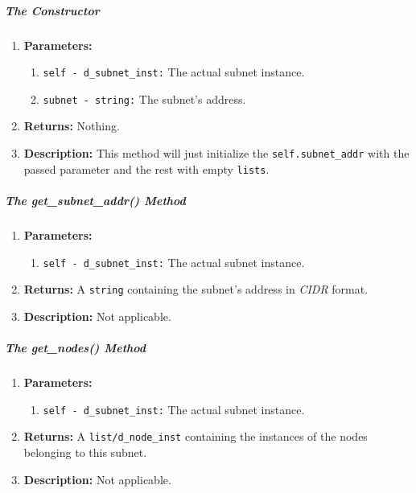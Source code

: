         \subparagraph{The Constructor}
            \begin{enumerate}
                \item \textbf{Parameters:}
                \begin{enumerate}
                    \item \texttt{self - d\_subnet\_inst:} The actual subnet instance.
                    \item \texttt{subnet - string:} The subnet's address.
                \end{enumerate}
                \item \textbf{Returns:} Nothing.
                \item \textbf{Description:} This method will just initialize the \texttt{self.subnet\_addr} with the passed parameter and the rest with empty \texttt{lists}.
            \end{enumerate}

        \subparagraph{The get\_subnet\_addr() Method}
            \begin{enumerate}
                \item \textbf{Parameters:}
                \begin{enumerate}
                    \item \texttt{self - d\_subnet\_inst:} The actual subnet instance.
                \end{enumerate}
                \item \textbf{Returns:} A \texttt{string} containing the subnet's address in \textit{CIDR} format.
                \item \textbf{Description:} Not applicable.
            \end{enumerate}

        \subparagraph{The get\_nodes() Method}
            \begin{enumerate}
                \item \textbf{Parameters:}
                \begin{enumerate}
                    \item \texttt{self - d\_subnet\_inst:} The actual subnet instance.
                \end{enumerate}
                \item \textbf{Returns:} A \texttt{list/d\_node\_inst} containing the instances of the nodes belonging to this subnet.
                \item \textbf{Description:} Not applicable.
            \end{enumerate}

